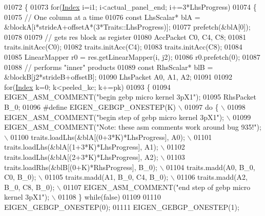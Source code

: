 \begin{DoxyCode}
01072         \{
01073           \textcolor{keywordflow}{for}(\hyperlink{namespace_eigen_a62e77e0933482dafde8fe197d9a2cfde}{Index} i=i1; i<actual\_panel\_end; i+=3*LhsProgress)
01074           \{
01075           \textcolor{comment}{// One column at a time}
01076           \textcolor{keyword}{const} LhsScalar* blA = &blockA[i*strideA+offsetA*(3*Traits::LhsProgress)];
01077           prefetch(&blA[0]);
01078 
01079           \textcolor{comment}{// gets res block as register}
01080           AccPacket C0, C4, C8;
01081           traits.initAcc(C0);
01082           traits.initAcc(C4);
01083           traits.initAcc(C8);
01084 
01085           LinearMapper r0 = res.getLinearMapper(i, j2);
01086           r0.prefetch(0);
01087 
01088           \textcolor{comment}{// performs "inner" products}
01089           \textcolor{keyword}{const} RhsScalar* blB = &blockB[j2*strideB+offsetB];
01090           LhsPacket A0, A1, A2;
01091           
01092           \textcolor{keywordflow}{for}(\hyperlink{namespace_eigen_a62e77e0933482dafde8fe197d9a2cfde}{Index} k=0; k<peeled\_kc; k+=pk)
01093           \{
01094             EIGEN\_ASM\_COMMENT(\textcolor{stringliteral}{"begin gebp micro kernel 3pX1"});
01095             RhsPacket B\_0;
01096 \textcolor{preprocessor}{#define EIGEN\_GEBGP\_ONESTEP(K) \(\backslash\)}
01097 \textcolor{preprocessor}{            do \{ \(\backslash\)}
01098 \textcolor{preprocessor}{              EIGEN\_ASM\_COMMENT("begin step of gebp micro kernel 3pX1"); \(\backslash\)}
01099 \textcolor{preprocessor}{              EIGEN\_ASM\_COMMENT("Note: these asm comments work around bug 935!"); \(\backslash\)}
01100 \textcolor{preprocessor}{              traits.loadLhs(&blA[(0+3*K)*LhsProgress], A0);  \(\backslash\)}
01101 \textcolor{preprocessor}{              traits.loadLhs(&blA[(1+3*K)*LhsProgress], A1);  \(\backslash\)}
01102 \textcolor{preprocessor}{              traits.loadLhs(&blA[(2+3*K)*LhsProgress], A2);  \(\backslash\)}
01103 \textcolor{preprocessor}{              traits.loadRhs(&blB[(0+K)*RhsProgress], B\_0);   \(\backslash\)}
01104 \textcolor{preprocessor}{              traits.madd(A0, B\_0, C0, B\_0); \(\backslash\)}
01105 \textcolor{preprocessor}{              traits.madd(A1, B\_0, C4, B\_0); \(\backslash\)}
01106 \textcolor{preprocessor}{              traits.madd(A2, B\_0, C8, B\_0); \(\backslash\)}
01107 \textcolor{preprocessor}{              EIGEN\_ASM\_COMMENT("end step of gebp micro kernel 3pX1"); \(\backslash\)}
01108 \textcolor{preprocessor}{            \} while(false)}
01109         
01110             EIGEN\_GEBGP\_ONESTEP(0);
01111             EIGEN\_GEBGP\_ONESTEP(1);

\end{DoxyCode}

